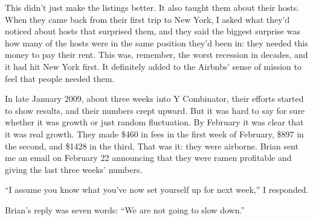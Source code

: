 This didn't just make the listings better. It also taught them about
their hosts. When they came back from their first trip to New York, I
asked what they'd noticed about hosts that surprised them, and they said
the biggest surprise was how many of the hosts were in the same position
they'd been in: they needed this money to pay their rent. This was,
remember, the worst recession in decades, and it had hit New York first.
It definitely added to the Airbnbs' sense of mission to feel that people
needed them.

In late January 2009, about three weeks into Y Combinator, their efforts
started to show results, and their numbers crept upward. But it was hard
to say for sure whether it was growth or just random fluctuation. By
February it was clear that it was real growth. They made \$460 in fees
in the first week of February, \$897 in the second, and \$1428 in the
third. That was it: they were airborne. Brian sent me an email on
February 22 announcing that they were ramen profitable and giving the
last three weeks' numbers.

``I assume you know what you've now set yourself up for next week,'' I
responded.

Brian's reply was seven words: ``We are not going to slow down.''